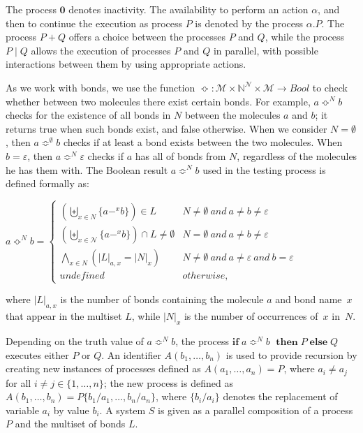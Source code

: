 \documentclass[runningheads]{llncs}
\newcommand{\N}{\mathbb{N}}
\newcommand{\mN}{\mathcal{N}}
\begin{document}
The process $\textbf{0}$ denotes inactivity. The availability to perform an 
action $\alpha$, and then to continue the execution as process $P$ is denoted 
by the process $\alpha.P$. The process $P+Q$ offers a choice 
between the processes $P$ and $Q$, while the process $P \mid Q$ allows the 
execution of processes $P$ and $Q$ in parallel, with possible interactions 
between them by using appropriate actions.

As we work with bonds, we use the function $\Bumpeq: \mathcal{M}\times 
\N^{\mN} \times \mathcal{M} \rightarrow Bool$ to check whether between two 
molecules there exist certain bonds. For example, $a\Bumpeq^N b$ checks for the 
existence of all bonds in $N$ between the molecules $a$ and $b$; it 
returns true when such bonds exist, and false otherwise. When we consider 
$N=\emptyset$, then $a\Bumpeq^{\emptyset}b$ checks if at least a bond 
exists between the two molecules. When $b=\varepsilon$, then $a\Bumpeq^N 
{\varepsilon}$ checks if $a$ has all of bonds from $N$, regardless of 
the molecules he has them with. The Boolean result $a \Bumpeq^N b$ used 
in the testing process is defined formally as:
\smallskip

$a \Bumpeq^N b=\begin{cases}
\displaystyle(\biguplus_{x \in N} \{a-^x b\}) \in L & N \neq \emptyset~and ~a \neq b \neq \varepsilon\\
\displaystyle(\biguplus_{x \in \mN} \{a-^x b\}) \cap L \neq \emptyset & N = \emptyset~and ~a \neq b \neq \varepsilon\\
\displaystyle\bigwedge_{x \in N} (|L|_{a,x}=|N|_x) & N \neq \emptyset~and ~a \neq \varepsilon ~and~b = \varepsilon\\
undefined & otherwise,
\end{cases}$

\noindent where $|L|_{a,x}$ is the number of bonds containing the molecule 
$a$ and bond name~$x$ that appear in the multiset $L$, while $|N|_x$ is 
the number of occurrences of~$x$ in~$N$.

Depending on the truth value of $a \Bumpeq^N\!\! b $, the process 
$\textbf{if}\;a \Bumpeq^N\!\! b$ $\;\textbf{then}\;P\;\textbf{else}\;Q$ 
executes either $P$ or $Q$.  An identifier $ A(b_1,\ldots,b_n) $ is used 
to provide recursion by creating new instances of processes defined as 
$A(a_1,\ldots,a_n)=P$, where $a_i \neq a_j$ for all $i\neq j \in 
\{1,\ldots,n\}$; the new process is defined as $ A(b_1,\ldots,b_n) 
=P\{b_1/a_1,\ldots,b_n/a_n\}$, where $\{b_i/a_i\}$ denotes the replacement 
of variable $a_i$ by value $b_i$. A system $S$ is given as a parallel 
composition of a process $P$ and the multiset of bonds $L$.
\smallskip
\end{document}
